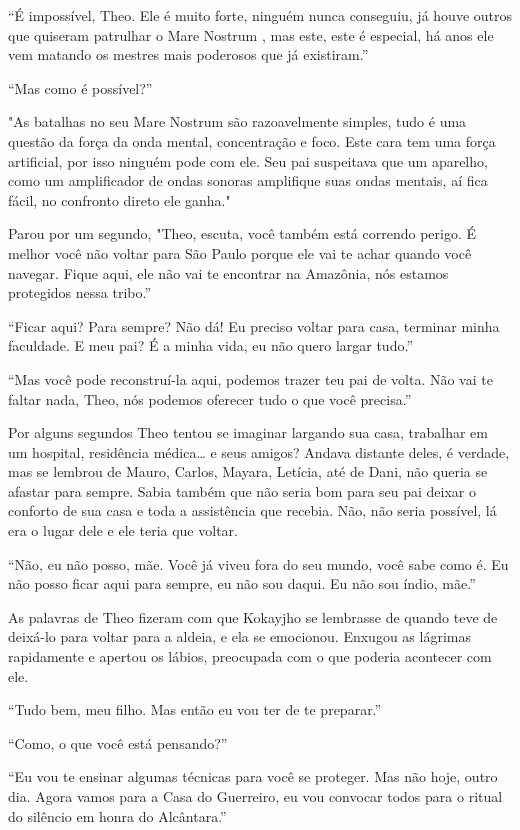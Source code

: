 ``É impossível, Theo. Ele é muito forte, ninguém nunca conseguiu, já
houve outros que quiseram patrulhar o Mare Nostrum , mas este, este é
especial, há anos ele vem matando os mestres mais poderosos que já
existiram.''

``Mas como é possível?''

"As batalhas no seu Mare Nostrum são razoavelmente simples, tudo é uma
questão da força da onda mental, concentração e foco. Este cara tem uma
força artificial, por isso ninguém pode com ele. Seu pai suspeitava que
um aparelho, como um amplificador de ondas sonoras amplifique suas ondas
mentais, aí fica fácil, no confronto direto ele ganha."

Parou por um segundo, "Theo, escuta, você também está correndo perigo. É
melhor você não voltar para São Paulo porque ele vai te achar quando
você navegar. Fique aqui, ele não vai te encontrar na Amazônia, nós
estamos protegidos nessa tribo.''

``Ficar aqui? Para sempre? Não dá! Eu preciso voltar para casa, terminar
minha faculdade. E meu pai? É a minha vida, eu não quero largar tudo.''

``Mas você pode reconstruí-la aqui, podemos trazer teu pai de volta. Não
vai te faltar nada, Theo, nós podemos oferecer tudo o que você
precisa.''

Por alguns segundos Theo tentou se imaginar largando sua casa, trabalhar
em um hospital, residência médica\ldots{} e seus amigos? Andava distante
deles, é verdade, mas se lembrou de Mauro, Carlos, Mayara, Letícia, até
de Dani, não queria se afastar para sempre. Sabia também que não seria
bom para seu pai deixar o conforto de sua casa e toda a assistência que
recebia. Não, não seria possível, lá era o lugar dele e ele teria que
voltar.

``Não, eu não posso, mãe. Você já viveu fora do seu mundo, você sabe
como é. Eu não posso ficar aqui para sempre, eu não sou daqui. Eu não
sou índio, mãe.''

As palavras de Theo fizeram com que Kokayjho se lembrasse de quando teve
de deixá-lo para voltar para a aldeia, e ela se emocionou. Enxugou as
lágrimas rapidamente e apertou os lábios, preocupada com o que poderia
acontecer com ele.

``Tudo bem, meu filho. Mas então eu vou ter de te preparar.''

``Como, o que você está pensando?''

``Eu vou te ensinar algumas técnicas para você se proteger. Mas não
hoje, outro dia. Agora vamos para a Casa do Guerreiro, eu vou convocar
todos para o ritual do silêncio em honra do Alcântara.''


